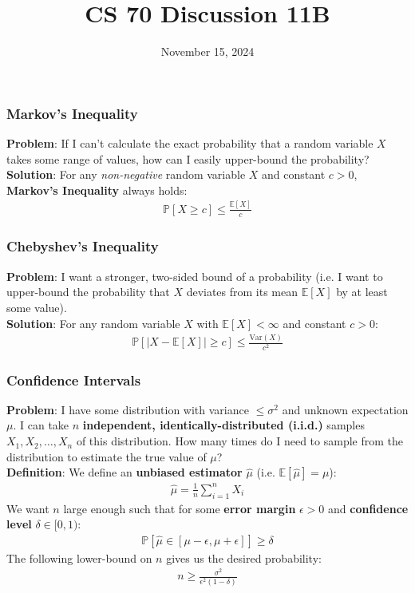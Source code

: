 \documentclass{beamer}
\title{CS 70 Discussion 11B}
\date{November 15, 2024}
\begin{document}
\frame{\titlepage}

\begin{frame}
    \frametitle{Markov's Inequality}
    {\bf Problem}: If I can't calculate the exact probability that a random variable $X$ takes some range of values, how can I easily upper-bound the probability?\\
    {\bf Solution}: For any {\it non-negative} random variable $X$ and constant $c>0$, {\bf Markov's Inequality} always holds:
    \begin{align*}
        \mathbb{P}[X\geq c]\leq\frac{\mathbb{E}[X]}{c}
    \end{align*}
\end{frame}

\begin{frame}
    \frametitle{Chebyshev's Inequality}
    {\bf Problem}: I want a stronger, two-sided bound of a probability (i.e. I want to upper-bound the probability that $X$ deviates from its mean $\mathbb{E}[X]$ by at least some value).\\
    {\bf Solution}: For any random variable $X$ with $\mathbb{E}[X]<\infty$ and constant $c>0$:
    \begin{align*}
        \mathbb{P}[|X-\mathbb{E}[X]|\geq c]\leq\frac{\text{Var}(X)}{c^2}
    \end{align*}
\end{frame}

\begin{frame}
    \frametitle{Confidence Intervals}
    {\bf Problem}: I have some distribution with variance $\leq\sigma^2$ and unknown expectation $\mu$. I can take $n$ {\bf independent, identically-distributed (i.i.d.)} samples $X_1,X_2,\dots,X_n$ of this distribution. How many times do I need to sample from the distribution to estimate the true value of $\mu$?\\
    {\bf Definition}: We define an {\bf unbiased estimator} $\hat{\mu}$ (i.e. $\mathbb{E}\left[\hat{\mu}\right]=\mu$):
    \begin{align*}
        \hat{\mu}=\frac{1}{n}\sum_{i=1}^nX_i
    \end{align*}
    We want $n$ large enough such that for some {\bf error margin} $\epsilon>0$ and {\bf confidence level} $\delta\in[0,1)$:
    \begin{align*}
        \mathbb{P}[\hat{\mu}\in[\mu-\epsilon,\mu+\epsilon]]\geq \delta
    \end{align*}
    The following lower-bound on $n$ gives us the desired probability:
    \begin{align*}
        n\geq\frac{\sigma^2}{\epsilon^2(1-\delta)}
    \end{align*}
\end{frame}
\end{document}
